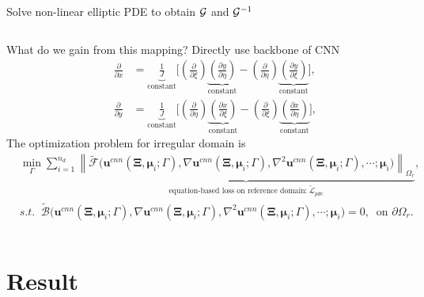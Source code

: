 \documentclass{beamer}
\begin{document}
\begin{frame}{Solve non-linear elliptic PDE to obtain $\mathcal{G}$ and $\mathcal{G}^{-1}$}
\begin{columns}[c]
\pause
What do we gain from this mapping? Directly use backbone of CNN
\pause
\tiny
\begin{equation*}
	\begin{split}
		\label{eqn:Du}
		\frac{\partial }{\partial x}&=\underbrace{\frac{1}{J}}_{\text{constant}}\Big[\left(\frac{\partial }{\partial \xi}\right) \underbrace{\left(\frac{\partial y}{\partial \eta}\right)}_{\text{constant}} - \left(\frac{\partial }{\partial \eta}\right) \underbrace{\left(\frac{\partial y}{\partial \xi}\right)}_{\text{constant}}\Big],\\
		\frac{\partial }{\partial y}&=\underbrace{\frac{1}{J}}_{\text{constant}}\Big[\left(\frac{\partial }{\partial \eta}\right) \underbrace{\left(\frac{\partial x}{\partial\xi}\right)}_{\text{constant}} - \left(\frac{\partial }{\partial \xi}\right) \underbrace{\left(\frac{\partial x}{\partial \eta}\right)}_{\text{constant}}\Big],
	\end{split}
\end{equation*}
\normalsize
\pause
The optimization problem for irregular domain is
\tiny
\begin{equation*}
\label{eqn:optmizationNew}
\begin{split}
&\min_{\Gamma} \sum_{i=1}^{n_d}
\underbrace{\left\|
	\tilde{\mathcal{F}}\Big(\mathbf{u}^{cnn}(\boldsymbol{\Xi}, \boldsymbol{\mu}_i; \Gamma),
	\nabla\mathbf{u}^{cnn}(\boldsymbol{\Xi}, \boldsymbol{\mu}_i; \Gamma), 
	\nabla^2\mathbf{u}^{cnn}(\boldsymbol{\Xi}, \boldsymbol{\mu}_i; \Gamma), \cdots; \boldsymbol{\mu}_i\Big) \right\|_{\Omega_{r}}}_{\text{equation-based loss on reference domain:}\ \tilde{\mathcal{L}}_{pde}},\\
&s.t.\;\; \tilde{\mathcal{B}}\Big(\mathbf{u}^{cnn}(\boldsymbol{\Xi}, \boldsymbol{\mu}_i; \Gamma),
\nabla\mathbf{u}^{cnn}(\boldsymbol{\Xi}, \boldsymbol{\mu}_i; \Gamma), 
\nabla^2\mathbf{u}^{cnn}(\boldsymbol{\Xi}, \boldsymbol{\mu}_i; \Gamma), \cdots;
\boldsymbol{\mu}_i\Big)=0,\;\;\text{on }\partial\Omega_{r}.
\end{split}
\end{equation*} 
\end{columns}
\end{frame}


\section{Result}
\end{document}
